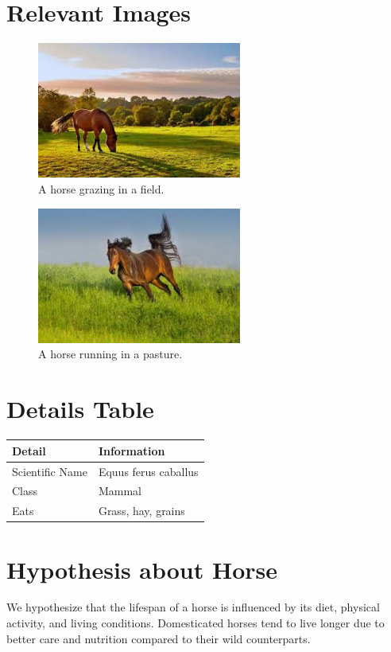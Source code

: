 \documentclass[12pt]{article}
\begin{document}
\section{Relevant Images}
\begin{figure}[h]
    \centering
    \includegraphics[width=0.6\textwidth]{horse1.jpg} 
    \caption{A horse grazing in a field.}
\end{figure}

\begin{figure}[h]
    \centering
    \includegraphics[width=0.6\textwidth]{horse2.jpg} 
    \caption{A horse running in a pasture.}
\end{figure}

\section{Details Table}
\begin{tabular}{|l|l|}
\hline
\textbf{Detail}         & \textbf{Information} \\ \hline
Scientific Name         & Equus ferus caballus \\ \hline
Class                   & Mammal \\ \hline
Eats                    & Grass, hay, grains \\ \hline
\end{tabular}

\section{Hypothesis about Horse}
We hypothesize that the lifespan of a horse is influenced by its diet, physical activity, and living conditions. Domesticated horses tend to live longer due to better care and nutrition compared to their wild counterparts.
\end{document}
